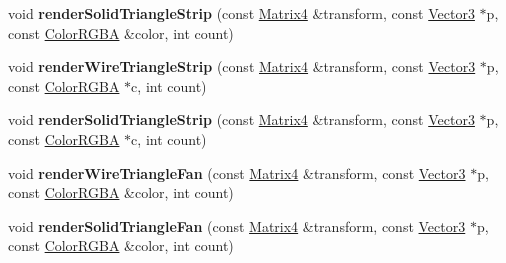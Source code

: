 \begin{DoxyCompactItemize}
\item 
void {\bfseries render\+Solid\+Triangle\+Strip} (const \hyperlink{class_i_dream_sky_1_1_matrix4}{Matrix4} \&transform, const \hyperlink{class_i_dream_sky_1_1_vector3}{Vector3} $\ast$p, const \hyperlink{class_i_dream_sky_1_1_color_r_g_b_a}{Color\+R\+G\+BA} \&color, int count)\hypertarget{class_i_dream_sky_1_1_i_component_debug_renderer_a3302ff82d543f152dac1a0847a8b78d6}{}\label{class_i_dream_sky_1_1_i_component_debug_renderer_a3302ff82d543f152dac1a0847a8b78d6}

\item 
void {\bfseries render\+Wire\+Triangle\+Strip} (const \hyperlink{class_i_dream_sky_1_1_matrix4}{Matrix4} \&transform, const \hyperlink{class_i_dream_sky_1_1_vector3}{Vector3} $\ast$p, const \hyperlink{class_i_dream_sky_1_1_color_r_g_b_a}{Color\+R\+G\+BA} $\ast$c, int count)\hypertarget{class_i_dream_sky_1_1_i_component_debug_renderer_ada247203df7f38c148f1e106feb8c8bd}{}\label{class_i_dream_sky_1_1_i_component_debug_renderer_ada247203df7f38c148f1e106feb8c8bd}

\item 
void {\bfseries render\+Solid\+Triangle\+Strip} (const \hyperlink{class_i_dream_sky_1_1_matrix4}{Matrix4} \&transform, const \hyperlink{class_i_dream_sky_1_1_vector3}{Vector3} $\ast$p, const \hyperlink{class_i_dream_sky_1_1_color_r_g_b_a}{Color\+R\+G\+BA} $\ast$c, int count)\hypertarget{class_i_dream_sky_1_1_i_component_debug_renderer_aee2b2d572d55e0da9dce15a44d38482c}{}\label{class_i_dream_sky_1_1_i_component_debug_renderer_aee2b2d572d55e0da9dce15a44d38482c}

\item 
void {\bfseries render\+Wire\+Triangle\+Fan} (const \hyperlink{class_i_dream_sky_1_1_matrix4}{Matrix4} \&transform, const \hyperlink{class_i_dream_sky_1_1_vector3}{Vector3} $\ast$p, const \hyperlink{class_i_dream_sky_1_1_color_r_g_b_a}{Color\+R\+G\+BA} \&color, int count)\hypertarget{class_i_dream_sky_1_1_i_component_debug_renderer_ab0effa0625b471841df6ab8657a23b13}{}\label{class_i_dream_sky_1_1_i_component_debug_renderer_ab0effa0625b471841df6ab8657a23b13}

\item 
void {\bfseries render\+Solid\+Triangle\+Fan} (const \hyperlink{class_i_dream_sky_1_1_matrix4}{Matrix4} \&transform, const \hyperlink{class_i_dream_sky_1_1_vector3}{Vector3} $\ast$p, const \hyperlink{class_i_dream_sky_1_1_color_r_g_b_a}{Color\+R\+G\+BA} \&color, int count)\hypertarget{class_i_dream_sky_1_1_i_component_debug_renderer_aa75042a3f7713641d32d8fe9bf8bef67}{}\label{class_i_dream_sky_1_1_i_component_debug_renderer_aa75042a3f7713641d32d8fe9bf8bef67}


\end{DoxyCompactItemize}
